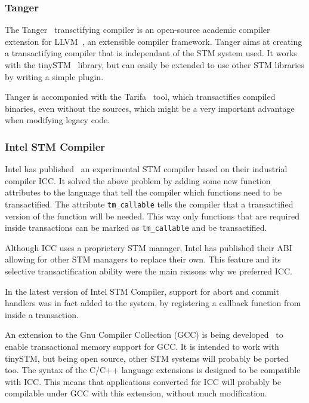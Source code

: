 \documentclass[preprint,11pt]{sigplanconf}
\let \cite = \citep
\begin{document}
\subsubsection{\sc Tanger}
The {\sc Tanger}~\cite{felber2007tanger} transctifying compiler is an
open-source academic compiler extension for LLVM~\cite{LLVM:CGO04}, an
extensible compiler framework.  Tanger aims at creating a transactifying
compiler that is independant of the STM system used. It works with the
tinySTM~\cite{felber2008tinystm} library, but can easily be extended to use
other STM libraries by writing a simple plugin.

{\sc Tanger} is accompanied with the {\sc Tarifa}~\cite{felber2007tanger}
tool, which transactifies compiled binaries, even without the sources, which
might be a very important advantage when modifying legacy code.

\subsubsection{Intel STM Compiler}
Intel has published~\cite{icc} an experimental STM compiler based on their industrial
compiler ICC. It solved the above problem by adding some new function attributes
to the language that tell the compiler which functions need to be transactified.
The attribute {\tt tm\_callable} tells the compiler that a transactified version
of the function will be needed. This way only functions that are required inside
transactions can be marked as {\tt tm\_callable} and be transactified.

Although ICC uses a proprietery STM manager, Intel has published their
ABI~\cite{icc:abi} allowing for other STM managers to replace their own. This feature
and its selective transactification ability were the main reasons why we
preferred ICC.

In the latest version of Intel STM Compiler, support for abort and commit
handlers was in fact added to the system, by registering a callback function
from inside a transaction.

An extension to the Gnu Compiler Collection (GCC) is being developed~\cite{gcctm} to
enable transactional memory support for GCC. It is intended to work with
tinySTM, but being open source, other STM systems will probably be ported too.
The syntax of the C/C++ language extensions is designed to be compatible with
ICC. This means that applications converted for ICC will probably be compilable
under GCC with this extension, without much modification.
\end{document}
